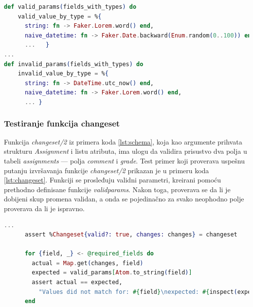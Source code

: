 \documentclass[12pt,oneside]{memoir}
\begin{document}
\begin{minipage}{\linewidth}
\begin{lstlisting}[language=elixir, basicstyle=\small, caption={Definicije pomoćnih funkcija \emph{valid{\textunderscore}params} i \emph{invalid{\textunderscore}params}},captionpos=b, label={lst:faker}]
def valid_params(fields_with_types) do
    valid_value_by_type = %{
      string: fn -> Faker.Lorem.word() end,
      naive_datetime: fn -> Faker.Date.backward(Enum.random(0..100)) end,
      ...   }
...
def invalid_params(fields_with_types) do
    invalid_value_by_type = %{
      string: fn -> DateTime.utc_now() end,
      naive_datetime: fn -> Faker.Lorem.word() end,
      ... }
\end{lstlisting}
\end{minipage}

\subsubsection{Testiranje funkcija changeset}

\par Funkcija \emph{changeset/2} iz primera koda \ref{lst:schema}, koja kao argumente prihvata strukturu \emph{Assignment} i listu atributa, ima ulogu da validira prisustvo dva polja u tabeli \emph{assignments} --- polja \emph{comment} i \emph{grade}. Test primer koji proverava uspešnu putanju izvršavanja funkcije \emph{changeset/2} prikazan je u primeru koda \ref{lst:changeset}. Funkciji se prosleđuju validni parametri, kreirani pomoću prethodno definisane funkcije \emph{valid{\textunderscore}params}. Nakon toga, proverava se da li je dobijeni skup promena validan, a onda se pojedinačno za svako neophodno polje proverava da li je ispravno. \\

\begin{minipage}{\linewidth}
\begin{lstlisting}[language=elixir, basicstyle=\small, caption={Test primer uspešne upotrebe funkcije \emph{changeset/2}},captionpos=b, label={lst:changeset}]
      ... 
      assert %Changeset{valid?: true, changes: changes} = changeset

      for {field, _} <- @required_fields do
        actual = Map.get(changes, field)
        expected = valid_params[Atom.to_string(field)]
        assert actual == expected,
          "Values did not match for: #{field}\nexpected: #{inspect(expected)}\nactual: #{inspect(actual)}"
      end 
\end{lstlisting}
\end{minipage}
\end{document}
